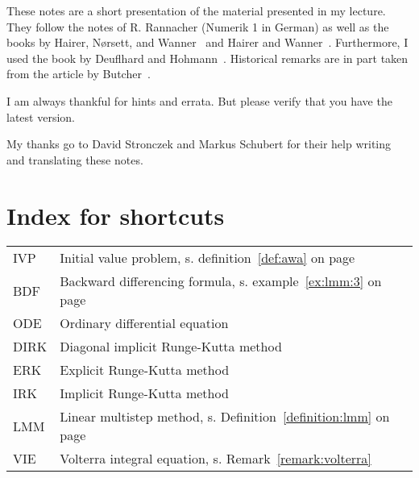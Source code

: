 

These notes are a short presentation of the material presented in my
lecture. They follow the notes of R. Rannacher (Numerik 1 in German)
as well as the books by Hairer, Nørsett, and
Wanner~\cite{HairerNorsettWanner93} and Hairer and
Wanner~\cite{HairerWanner10}. Furthermore, I used the book by
Deuflhard and Hohmann~\cite{DeuflhardBornemann08}. Historical remarks
are in part taken from the article by Butcher~\cite{Butcher96}.

I am always thankful for hints and errata. But please verify that you
have the latest version.

My thanks go to David Stronczek and Markus Schubert for their help
writing and translating these notes.

\clearpage
\section*{Index for shortcuts}
\begin{tabular}{ll}
  IVP & Initial value problem, s. definition~\ref{def:awa} on page~\pageref{def:awa}\\
  BDF & Backward differencing formula, s. example~\ref{ex:lmm:3} on page~\pageref{ex:lmm:3}\\
  ODE & Ordinary differential equation\\
  DIRK & Diagonal implicit Runge-Kutta method\\
  ERK & Explicit Runge-Kutta method\\
  IRK & Implicit Runge-Kutta method\\
  LMM & Linear multistep method, s. Definition~\ref{definition:lmm} on
  page~\pageref{ex:lmm:1}\\
  VIE & Volterra integral equation, s. Remark~\vref{remark:volterra}
\end{tabular}

